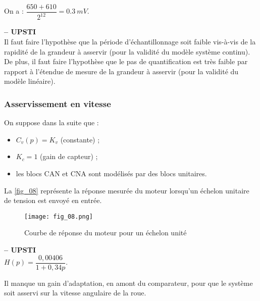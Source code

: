 \ifprof
\begin{corrige}
On  a : $\dfrac{650+610}{2^{12}} = \SI{0,3}{mV}$.
\end{corrige}
\else
\fi

\ifprof
\begin{corrige} \textbf{ -- UPSTI}\\
 Il faut faire l’hypothèse que la période d’échantillonnage soit faible vis-à-vis de la rapidité 
de la grandeur à asservir (pour la validité du modèle système continu). De plus, il faut faire 
l’hypothèse que le pas de quantification est très faible par rapport à l’étendue de mesure de la 
grandeur à asservir (pour la validité du modèle linéaire).
\end{corrige}
\else
\fi

\subsubsection{Asservissement en vitesse}

On suppose dans la suite que :
\begin{itemize}
\item $C_v ( p)=K_v$ (constante) ;
\item $K_c =1$ (gain de capteur) ;
\item  les blocs CAN et CNA sont modélisés par des blocs unitaires.
\end{itemize}

La \autoref{fig_08} représente la réponse mesurée du moteur lorsqu’un échelon unitaire de tension est
envoyé en entrée.

\begin{figure}[H]
\centering
\texttt{[image: fig\_08.png]}
\caption{Courbe de réponse du moteur pour un échelon unité\label{fig_08}}
\end{figure}

\ifprof
\begin{corrige}\textbf{ -- UPSTI}\\ 
$H(p)=\dfrac{0,00406}{1+0,34p}$.
\end{corrige}
\else
\fi

Il manque un gain d'adaptation, en amont du comparateur, pour que le système soit asservi sur la vitesse angulaire de la roue.

